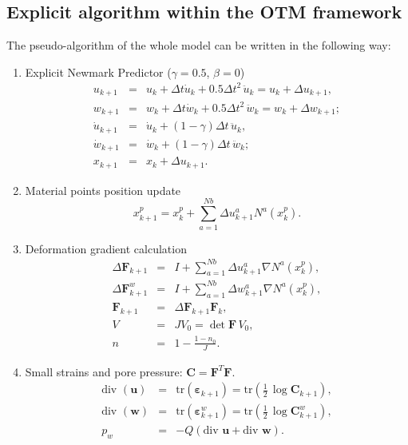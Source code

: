\documentclass[twocolumn]{svjour3}          %
\begin{document}
\subsection{Explicit algorithm within the OTM framework} \label{subsec:42}
The pseudo-algorithm of the whole model can be written in the following way:
\begin{enumerate}
\item  Explicit Newmark Predictor ($\gamma=0.5$, $\beta=0$)
\begin{eqnarray*}
u_{k+1} &=&u_k+\Delta t \dot{u}_{k}+0.5\Delta t^2 \, \ddot{u}_k=u_k+\Delta u_{k+1}, \\
w_{k+1} &=&w_k+\Delta t \dot{w}_{k}+0.5\Delta t^2 \, \ddot{w}_k=w_k+\Delta w_{k+1};\\
\dot{u}_{k+1}&=&\dot{u}_{k}+(1-\gamma)\Delta t \,  \ddot{u}_{k}, \\
\dot{w}_{k+1}&=&\dot{w}_{k}+(1-\gamma)\Delta t \,  \ddot{w}_{k}; \\
x_{k+1}&=&x_{k}+\Delta u_{k+1} .
\end{eqnarray*}
\item  Material points position update
$$
x_{k+1}^p=x_{k}^p+\sum_{a=1}^{Nb}\Delta u_{k+1}^a N^a(x^p_{k}).
$$
\item Deformation gradient calculation
\begin{eqnarray*}
\Delta \mathbf{F}_{k+1} &=& I+\sum_{a=1}^{Nb}\Delta u_{k+1}^a \nabla N^a(x_{k}^p), \\
\Delta \mathbf{F}^w_{k+1} &=&I+\sum_{a=1}^{Nb}\Delta w_{k+1}^a \nabla N^a(x_{k}^p), \\
\mathbf{F}_{k+1} &=& \Delta \mathbf{F}_{k+1} \mathbf{F}_{k}, \\
V&=&JV_0=\det \mathbf{F} \, V_0,\\
n&=&1-\frac{1-n_0}{J}.
\end{eqnarray*}
\item  Small strains and pore pressure:
 $\mathbf{C}=\mathbf{F}^T\mathbf{F}$.
\begin{eqnarray*}
\mbox{div }(\boldsymbol{u}) &=& \mbox{tr}(\boldsymbol{\varepsilon}_{k+1})=\mbox{tr} \left (\frac{1}{2}\,\log\mathbf{C}_{k+1} \right), \\
\mbox{div }(\boldsymbol{w}) &=& \mbox{tr} (\boldsymbol{\varepsilon}^w_{k+1})=\mbox{tr} \left(\frac{1}{2}\,\log\mathbf{C}^w_{k+1} \right), \\
p_w&=&-Q \left( \mbox{div } \boldsymbol{u} + \mbox{div } \boldsymbol{w} \right).

\end{eqnarray*}
\end{enumerate}
\end{document}
